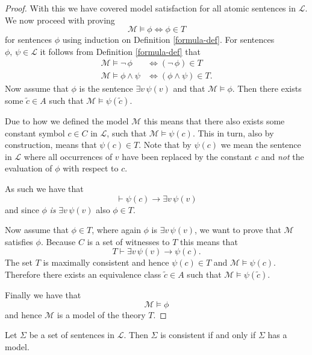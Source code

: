 \documentclass[../../main.tex]{subfiles}
\begin{document}
\begin{proof}
    With this we have covered model satisfaction for all atomic sentences in $\mathcal{L}$.
    We now proceed with proving 
    \begin{equation}\label{lemma-proof-forumula}
        \mathcal{M} \models \phi \iff \phi \in T
    \end{equation}
    for sentences $\phi$ using induction on Definition \ref{formula-def}.
    For sentences $\phi,\, \psi \in \mathcal{L}$ it follows from Definition \ref{formula-def} that
    \begin{align*}
        \mathcal{M} \models \lnot\, \phi &\iff (\lnot\, \phi) \in T \\
        \mathcal{M} \models \phi \wedge \psi &\iff (\phi \wedge \psi) \in T.
    \end{align*}
    Now assume that $\phi$ is the sentence $\exists v\, \psi(v)$ and that $\mathcal{M} \models \phi$.
    Then there exists some $\tilde{c} \in A$ such that $\mathcal{M} \models \psi(\tilde{c})$.
    
    Due to how we defined the model $\mathcal{M}$ this means that there also exists some constant symbol $c \in C$ in $\mathcal{L}$,
    such that $\mathcal{M} \models \psi(c)$.
    This in turn, also by construction, means that $\psi(c) \in T$.
    Note that by $\psi(c)$ we mean the sentence in $\mathcal{L}$ where all occurrences of $v$ have been replaced by the constant $c$ and \emph{not} the evaluation of $\phi$ with respect to $c$.
    
    As such we have that
    $$\vdash \psi(c) \rightarrow \exists v\, \psi(v)$$
    and since $\phi$ \emph{is} $\exists v\, \psi(v)$ also $\phi \in T$.

    Now assume that $\phi \in T$, where again $\phi$ is $\exists v\, \psi(v)$, we want to prove that $\mathcal{M}$ satisfies $\phi$.
    Because $C$ is a set of witnesses to $T$ this means that 
    $$T \vdash \exists v\, \psi(v) \rightarrow \psi(c).$$
    The set $T$ is maximally consistent and hence $\psi(c) \in T$ and $\mathcal{M} \models \psi(c)$.
    Therefore there exists an equivalence class $\tilde{c} \in A$ such that $\mathcal{M} \models \psi(\tilde{c})$.
    
    Finally we have that
    $$\mathcal{M} \models \phi$$
    and hence $\mathcal{M}$ is a model of the theory $T$.
\end{proof}

\begin{theorem}\label{completeness-thm}\cite[Theorem 1.3.21]{Cha90}
    Let $\Sigma$ be a set of sentences in $\mathcal{L}$.
    Then $\Sigma$ is consistent if and only if $\Sigma$ has a model.
\end{theorem}
\end{document}
